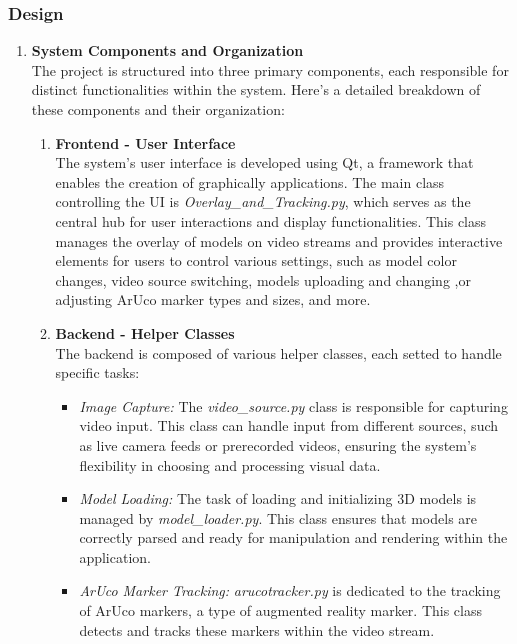 \documentclass[12pt]{article}
\begin{document}
\subsubsection{Design}
\begin{enumerate}
      \item \textbf{System Components and Organization}
            \\The project is structured into three primary components, each responsible for distinct functionalities within the system.
            Here’s a detailed breakdown of these components and their organization:
            \begin{enumerate}
                  \item \textbf{Frontend - User Interface}
                        \\The system's user interface is developed using Qt, a framework that enables the creation of graphically applications.
                        The main class controlling the UI is \emph{Overlay\_and\_Tracking.py}, which serves as the central hub for user interactions and display functionalities. 
                        This class manages the overlay of models on video streams and provides interactive elements for users to control various settings, such as model color changes,
                        video source switching, models uploading and changing ,or adjusting ArUco marker types and sizes, and more.
                  \item \textbf{Backend - Helper Classes}
                        \\The backend is composed of various helper classes, each setted to handle specific tasks:
                        \begin{itemize}
                              \item \textit{Image Capture:} The \emph{video\_source.py} class is responsible for capturing video input. This class can handle input from different sources,
                                    such as live camera feeds or pre\-recorded videos, ensuring the system's flexibility in choosing and processing visual data.
                              \item \textit{Model Loading:} The task of loading and initializing 3D models is managed by \emph{model\_loader.py}.
                                    This class ensures that models are correctly parsed and ready for manipulation and rendering within the application.
                              \item \textit{ArUco Marker Tracking:} \emph{arucotracker.py} is dedicated to the tracking of ArUco markers, a type of augmented reality marker.
                                    This class detects and tracks these markers within the video stream.
                        \end{itemize}


\end{enumerate}
\end{enumerate}
\end{document}
